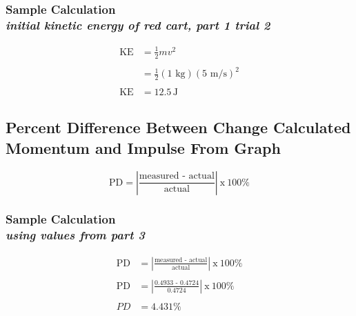 \subsubsection{Sample Calculation \\ {\normalfont \small\textit{initial kinetic energy of red cart, part 1 trial 2}}}

\begin{align*}
	\text{KE} &= \frac{1}{2}mv^2 \\ \\
										&= \frac{1}{2}(1 \text{ kg})(5 \text{ m/s})^2 \\ \\
	\text{KE} &= \boxed{12.5\,\text{J}}
\end{align*}

\newpage



\subsection{Percent Difference Between Change Calculated Momentum and Impulse From Graph}
\vspace{0.5cm}
\begin{equation}
	\text{PD}	= \left| \frac{\text{measured - actual}}{\text{actual}} \right|\: \text{x}\: 100\%
	\label{eq:pdiff}
\end{equation}

\subsubsection{Sample Calculation \\ {\normalfont \small\textit{using values from part 3}}}

\begin{align*}
	\text{PD}	&= \left| \frac{\text{measured - actual}}{\text{actual}} \right|\: \text{x}\: 100\% \\ \\
	\text{PD}	&= \left| \frac{\text{0.4933 - 0.4724}}{\text{0.4724}} \right|\: \text{x}\: 100\% \\ \\
			PD &= \boxed{4.431\%} 
\end{align*}
\newpage

